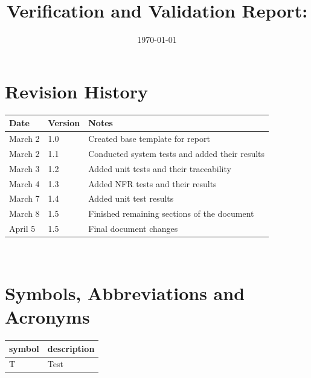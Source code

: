 \documentclass[12pt, titlepage]{article}
\begin{document}
	
	\title{Verification and Validation Report: \progname} 
	\author{\authname}
	\date{\today}
	
	\maketitle
	
	
	\section{Revision History}
	
	\begin{tabularx}{\textwidth}{p{3cm}p{2cm}X}
		\toprule {\bf Date} & {\bf Version} & {\bf Notes}\\
		\midrule
		March 2 & 1.0 & Created base template for report\\
		March 2 & 1.1 & Conducted system tests and added their results\\
		March 3 & 1.2 & Added unit tests and their traceability\\
		March 4 & 1.3 & Added NFR tests and their results \\
		March 7 & 1.4 & Added unit test results \\
		March 8 & 1.5 & Finished remaining sections of the document \\
		April 5 & 1.5 & Final document changes \\
		\bottomrule
	\end{tabularx}
	
	~\newpage
	
	\section{Symbols, Abbreviations and Acronyms}
	
	\renewcommand{\arraystretch}{1.2}
	\begin{tabular}{l l} 
		\toprule		
		\textbf{symbol} & \textbf{description}\\
		\midrule 
		T & Test\\
		\bottomrule
	\end{tabular}\\
	
	
	\newpage
	
	\tableofcontents
	
	\listoftables %
	
\end{document}
